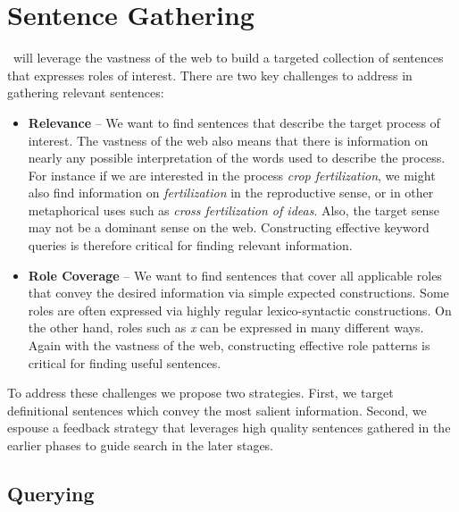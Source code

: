 \section{Sentence Gathering}

\sys\ will leverage the vastness of the web to build a targeted collection of sentences that expresses roles of interest.
There are two key challenges to address in gathering relevant sentences:
\begin{itemize}
\item {\bf Relevance} -- We want to find sentences that describe the target process of interest. 
The vastness of the web also means that there is information on nearly any possible interpretation of the words used to describe the process. 
For instance if we are interested in the process {\em crop fertilization}, we might also find information on {\em fertilization} in the reproductive sense, 
or in other metaphorical uses such as {\em cross fertilization of ideas}. 
Also, the target sense may not be a dominant sense on the web. 
Constructing effective keyword queries is therefore critical for finding relevant information.
\item {\bf Role Coverage} -- We want to find sentences that cover all applicable roles that convey the desired information via simple expected constructions.
Some roles are often expressed via highly regular lexico-syntactic constructions. 
On the other hand, roles such as {\em x} can be expressed in many different ways. 
Again with the vastness of the web, constructing effective role patterns is critical for finding useful sentences. 
\end{itemize}

To address these challenges we propose two strategies. First, we target definitional sentences which convey the most salient information. Second, we espouse a feedback strategy that leverages high quality sentences gathered in the earlier phases to guide search in the later stages.

\subsection{Querying}

